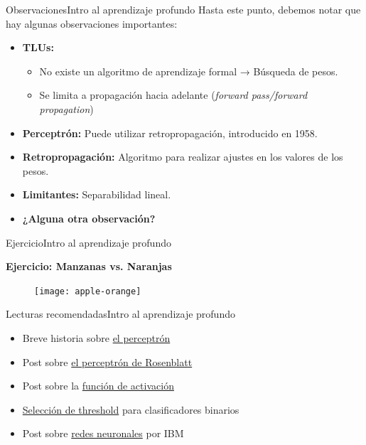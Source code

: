 \documentclass[10pt,border=3pt,tikz]{beamer}
\begin{document}
    \begin{frame}{Observaciones}{Intro al aprendizaje profundo}
        Hasta este punto, debemos notar que hay algunas observaciones importantes:
        \begin{itemize}
            \item \textbf{TLUs:} 
            \begin{itemize}
                \item No existe un algoritmo de aprendizaje formal → Búsqueda de pesos.
                \item Se limita a propagación hacia adelante (\textit{forward pass/forward propagation})
            \end{itemize}
            \item \textbf{Perceptrón:} Puede utilizar retropropagación, introducido en 1958.
            \item \textbf{Retropropagación:} Algoritmo para realizar ajustes en los valores de los pesos.
            \item \textbf{Limitantes:} Separabilidad lineal.
            \item \textbf{¿Alguna otra observación?}
        \end{itemize}
    \end{frame}
    
    \begin{frame}{Ejercicio}{Intro al aprendizaje profundo}
        \begin{center}
            {\Large \textbf{Ejercicio: Manzanas vs. Naranjas}}
        \end{center}
        \begin{figure}
            \centering
            \texttt{[image: apple-orange]}
        \end{figure}
    \end{frame}
    
    \begin{frame}{Lecturas recomendadas}{Intro al aprendizaje profundo}
        \begin{itemize}
            \item Breve historia sobre \colorbox{blue!10}{\href{https://telefonicatech.com/blog/historia-de-la-ia-frank-rosenblatt-y-e}{el perceptrón}}
            \item Post sobre \colorbox{blue!10}{\href{https://lamaquinaoraculo.com/deep-learning/el-perceptron-de-rosenblatt/}{el perceptrón de Rosenblatt}}
            \item Post sobre la \colorbox{blue!10}{\href{https://lamaquinaoraculo.com/deep-learning/la-funcion-de-activacion/}{función de activación}}
            \item \colorbox{blue!10}{\href{https://ploomber.io/blog/threshold/}{Selección de threshold}} para clasificadores binarios
            \item Post sobre \colorbox{blue!10}{\href{https://www.ibm.com/mx-es/topics/neural-networks}{redes neuronales}} por IBM
        \end{itemize}
    \end{frame}
    
\end{document}
